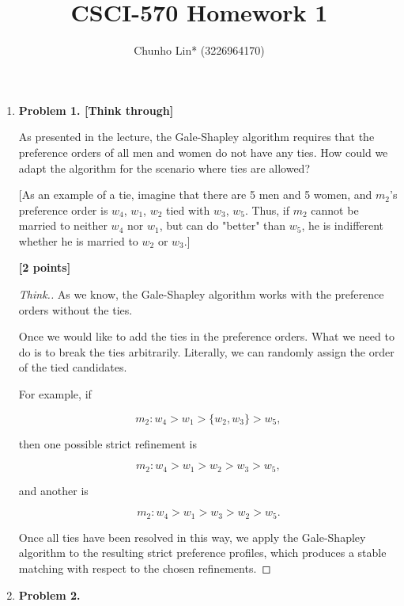\documentclass[11pt]{article}
\begin{document}
\author{Chunho Lin* (3226964170)}
\title{CSCI-570 Homework 1}
\maketitle

\medskip

\begin{enumerate}

\item \textbf{Problem 1. [Think through]}

As presented in the lecture, the Gale-Shapley algorithm requires that the preference orders of all men and women do not have any ties. How could we adapt the algorithm for the scenario where ties are allowed?

[As an example of a tie, imagine that there are 5 men and 5 women, and $m_2$'s preference order is $w_4$, $w_1$, $w_2$ tied with $w_3$, $w_5$. Thus, if $m_2$ cannot be married to neither $w_4$ nor $w_1$, but can do "better" than $w_5$, he is indifferent whether he is married to $w_2$ or $w_3$.]

\begin{flushright}
\textbf{[2 points]}
\end{flushright}

\begin{proof}[Think.]

As we know, the Gale-Shapley algorithm works with the preference orders without the ties.

Once we would like to add the ties in the preference orders. What we need to do is to break the ties arbitrarily. Literally, we can randomly assign the order of the tied candidates.

For example, if

$$
{m_2} : w_4 > w_1 > \{w_2, w_3\} > w_5,
$$

then one possible strict refinement is

$$
{m_2} : w_4 > w_1 > w_2 > w_3 > w_5,
$$

and another is

$$
{m_2} : w_4 > w_1 > w_3 > w_2 > w_5.
$$

Once all ties have been resolved in this way, we apply the Gale-Shapley algorithm to the resulting strict preference profiles, which produces a stable matching with respect to the chosen refinements.

\end{proof}

\newpage

\item \textbf{Problem 2.}


\end{enumerate}
\end{document}
